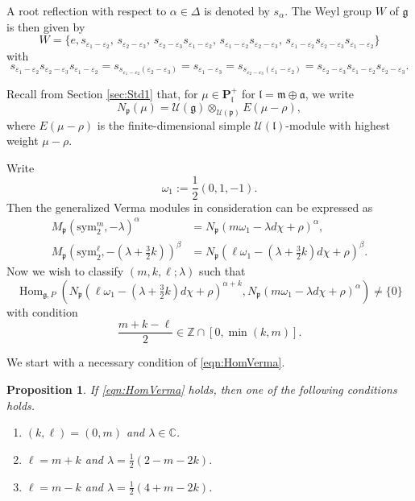 \documentclass[reqno,11pt]{amsart}
\newtheorem{prop}[equation]{Proposition}
\theoremstyle{remark}
\numberwithin{equation}{section}
\newcommand{\gb}{\beta}
\newcommand{\ga}{\alpha}
\newcommand{\gD}{\Delta}
\newcommand{\eps}{\varepsilon}
\newcommand{\fa}{{\mathfrak a}}
\newcommand{\fg}{{\mathfrak g}}
\newcommand{\fl}{{\mathfrak l}}
\newcommand{\fm}{{\mathfrak m}}
\newcommand{\fp}{{\mathfrak p}}
\newcommand{\C}{\mathbb{C}}
\newcommand{\Z}{\mathbb{Z}}
\newcommand{\Cal}{\mathcal}
\newcommand{\Hom}{\operatorname{Hom}}
\newcommand{\sym}{\mathrm{sym}}
\begin{document}
A root reflection with respect to $\ga \in \gD$ is denoted by $s_\ga$. 
The Weyl group $W$ of $\fg$ is then given by
\begin{equation}\label{eqn:Weyl}
W = \{e, 
s_{\eps_1-\eps_2}, \,
s_{\eps_2-\eps_3}, \,
s_{\eps_2-\eps_3}s_{\eps_1-\eps_2}, \,
s_{\eps_1-\eps_2}s_{\eps_2-\eps_3}, \,
s_{\eps_1-\eps_2}s_{\eps_2-\eps_3}s_{\eps_1-\eps_2}\}
\end{equation}
with
\begin{equation}\label{eqn:13}
s_{\eps_1-\eps_2}s_{\eps_2-\eps_3}s_{\eps_1-\eps_2}
= s_{s_{\eps_1-\eps_2}(\eps_2-\eps_3)}
=s_{\eps_1-\eps_3}
=s_{s_{\eps_2-\eps_3}(\eps_1-\eps_2)}
=s_{\eps_2-\eps_3}s_{\eps_1-\eps_2}s_{\eps_2-\eps_3}.
\end{equation}

\vskip 0.1in

Recall from Section \ref{sec:Std1} that, for $\mu \in \mathbf{P}^+_{\fl}$
for $\fl = \fm\oplus\fa$,
we write
\begin{equation*}
N_\fp(\mu)=\Cal{U}(\fg)\otimes_{\Cal{U}(\fp)} E(\mu-\rho),
\end{equation*}
where $E(\mu-\rho)$ is the finite-dimensional simple $\Cal{U}(\fl)$-module
with highest weight $\mu-\rho$. 

Write
\begin{equation*}
\omega_1:=\frac{1}{2}(0, 1, -1).
\end{equation*} 
Then the generalized Verma modules in consideration can be expressed as
\begin{align*}
M_\fp(\sym_2^m,-\lambda)^\ga
&=N_\fp(m\omega_1 -\lambda d\chi+\rho)^\ga, \\[5pt]
M_\fp(\sym_2^\ell, -(\lambda +\tfrac{3}{2}k))^\gb
&=N_\fp(\ell\omega_1 -(\lambda +\tfrac{3}{2}k)d\chi+\rho)^\gb.
\end{align*}
Now we wish to classify $(m,k,\ell; \lambda)$ such that
\begin{equation}\label{eqn:HomVerma}
\Hom_{\fg,P}
(N_\fp(\ell\omega_1 -(\lambda +\tfrac{3}{2}k)d\chi+\rho)^{\ga+k},
N_\fp(m\omega_1 -\lambda d\chi+\rho)^\ga)
\neq \{0\}
\end{equation}
with condition
\begin{equation}\label{eqn:cond}
\frac{m+k-\ell}{2} \in \Z\cap [0,\min(k,m)].
\end{equation}

We start with a necessary condition of \eqref{eqn:HomVerma}.

\begin{prop}\label{prop:Verma}
If \eqref{eqn:HomVerma} holds, then one of the following conditions holds.
\begin{enumerate}
\item[\emph{(a)}] $(k, \ell) = (0, m)$ and $\lambda \in \C$.
\item[\emph{(b)}] 
$\ell = m+k$ and $\lambda = \tfrac{1}{2}(2-m-2k)$.%
\item[\emph{(c)}] 
$\ell=m-k$ and $\lambda = \tfrac{1}{2}(4+m-2k)$.%
\end{enumerate}
\end{prop}
\end{document}
